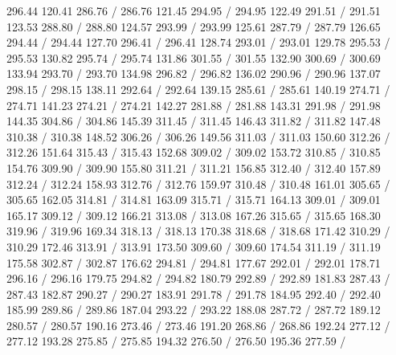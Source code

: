 { 296.44 120.41 286.76 /
 286.76 121.45 294.95 /
 294.95 122.49 291.51 /
 291.51 123.53 288.80 /
 288.80 124.57 293.99 /
 293.99 125.61 287.79 /
 287.79 126.65 294.44 /
 294.44 127.70 296.41 /
 296.41 128.74 293.01 /
 293.01 129.78 295.53 /
 295.53 130.82 295.74 /
 295.74 131.86 301.55 /
 301.55 132.90 300.69 /
 300.69 133.94 293.70 /
 293.70 134.98 296.82 /
 296.82 136.02 290.96 /
 290.96 137.07 298.15 /
 298.15 138.11 292.64 /
 292.64 139.15 285.61 /
 285.61 140.19 274.71 /
 274.71 141.23 274.21 /
 274.21 142.27 281.88 /
 281.88 143.31 291.98 /
 291.98 144.35 304.86 /
 304.86 145.39 311.45 /
 311.45 146.43 311.82 /
 311.82 147.48 310.38 /
 310.38 148.52 306.26 /
 306.26 149.56 311.03 /
 311.03 150.60 312.26 /
 312.26 151.64 315.43 /
 315.43 152.68 309.02 /
 309.02 153.72 310.85 /
 310.85 154.76 309.90 /
 309.90 155.80 311.21 /
 311.21 156.85 312.40 /
 312.40 157.89 312.24 /
 312.24 158.93 312.76 /
 312.76 159.97 310.48 /
 310.48 161.01 305.65 /
 305.65 162.05 314.81 /
 314.81 163.09 315.71 /
 315.71 164.13 309.01 /
 309.01 165.17 309.12 /
 309.12 166.21 313.08 /
 313.08 167.26 315.65 /
 315.65 168.30 319.96 /
 319.96 169.34 318.13 /
 318.13 170.38 318.68 /
 318.68 171.42 310.29 /
 310.29 172.46 313.91 /
 313.91 173.50 309.60 /
 309.60 174.54 311.19 /
 311.19 175.58 302.87 /
 302.87 176.62 294.81 /
 294.81 177.67 292.01 /
 292.01 178.71 296.16 /
 296.16 179.75 294.82 /
 294.82 180.79 292.89 /
 292.89 181.83 287.43 /
 287.43 182.87 290.27 /
 290.27 183.91 291.78 /
 291.78 184.95 292.40 /
 292.40 185.99 289.86 /
 289.86 187.04 293.22 /
 293.22 188.08 287.72 /
 287.72 189.12 280.57 /
 280.57 190.16 273.46 /
 273.46 191.20 268.86 /
 268.86 192.24 277.12 /
 277.12 193.28 275.85 /
 275.85 194.32 276.50 /
 276.50 195.36 277.59 /
}
